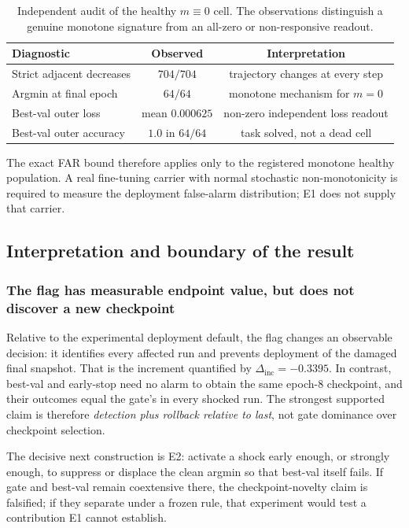 \documentclass{article} %
\theoremstyle{remark}
\begin{document}
\begin{table}[t]
\centering
\caption{Independent audit of the healthy $m\equiv0$ cell. The observations distinguish a genuine
monotone signature from an all-zero or non-responsive readout.}
\label{tab:healthy-audit}
\small
\begin{tabular}{lcc}
\toprule
\textbf{Diagnostic} & \textbf{Observed} & \textbf{Interpretation} \\
\midrule
Strict adjacent decreases & $704/704$ & trajectory changes at every step \\
Argmin at final epoch & $64/64$ & monotone mechanism for $m=0$ \\
Best-val outer loss & mean $0.000625$ & non-zero independent loss readout \\
Best-val outer accuracy & $1.0$ in $64/64$ & task solved, not a dead cell \\
\bottomrule
\end{tabular}
\end{table}

The exact FAR bound therefore applies only to the registered monotone healthy population. A real
fine-tuning carrier with normal stochastic non-monotonicity is required to measure the deployment
false-alarm distribution; E1 does not supply that carrier.

\newpage
\subsection{Interpretation and boundary of the result}
\label{sec:interpretation}

\subsubsection{The flag has measurable endpoint value, but does not discover a new checkpoint}
\label{sec:flag-value}

Relative to the experimental deployment default, the flag changes an observable decision: it
identifies every affected run and prevents deployment of the damaged final snapshot. That is the
increment quantified by $\Delta_{\mathrm{inc}}=-0.3395$. In contrast, best-val and early-stop need
no alarm to obtain the same epoch-8 checkpoint, and their outcomes equal the gate's in every
shocked run. The strongest supported claim is therefore \emph{detection plus rollback relative to
last}, not gate dominance over checkpoint selection.

The decisive next construction is E2: activate a shock early enough, or strongly enough, to
suppress or displace the clean argmin so that best-val itself fails. If gate and best-val remain
coextensive there, the checkpoint-novelty claim is falsified; if they separate under a frozen rule,
that experiment would test a contribution E1 cannot establish.
\end{document}
